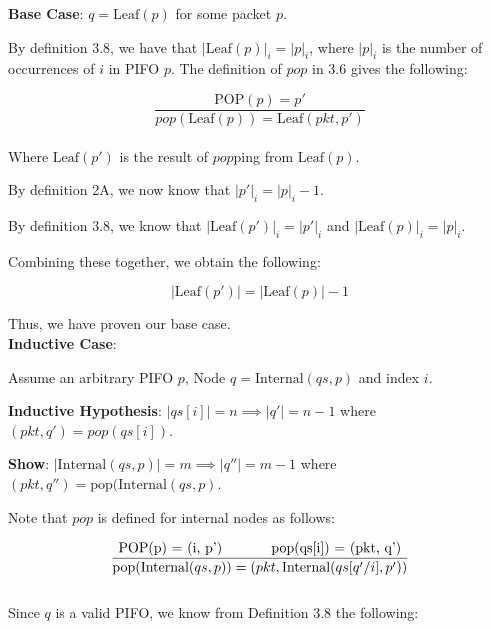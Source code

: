 \documentclass{article}
\begin{document}
\noindent \textbf{Base Case}: $q = \text{Leaf}(p)$ for some packet $p$.\newline

\noindent By definition 3.8, we have that $|\text{Leaf}(p)|_i = |p|_i$, where $|p|_i$ is the number of occurrences of $i$ in PIFO $p$. The definition of $pop$ in 3.6 gives the following:

$$\frac{\text{POP}(p) = p'}{pop(\text{Leaf}(p)) = \text{Leaf}(pkt, p')}$$\\[-10pt]

\noindent Where $\text{Leaf}(p')$ is the result of $pop$ping from $\text{Leaf}(p)$.\newline

\noindent By definition 2A, we now know that $|p'|_i = |p|_i - 1$.\newline

\noindent By definition 3.8, we know that $|\text{Leaf}(p')|_i = |p'|_i$ and $|\text{Leaf}(p)|_i = |p|_i$.\newline

\noindent Combining these together, we obtain the following:

$$|\text{Leaf}(p')| = |\text{Leaf}(p)| - 1$$

\noindent Thus, we have proven our base case.\\[10pt]

\noindent \textbf{Inductive Case}:\newline

\noindent Assume an arbitrary PIFO $p$, Node $q = \text{Internal}(qs, p)$ and index $i$.\newline

\noindent \textbf{Inductive Hypothesis}: $|qs[i]| = n \implies |q'| = n-1$ where $(pkt, q') = pop(qs[i])$.\newline

\noindent \textbf{Show}: $|\text{Internal}(qs, p)| = m \implies |q''| = m-1$ where $(pkt, q'') =\text{pop}(\text{Internal}(qs, p)$.\newline

\noindent Note that $pop$ is defined for internal nodes as follows:

$$\frac{\text{POP(p) = (i, p') \hspace{1cm} \text{pop}(qs[i]) = (pkt, q')}}{{\text{pop}(\text{Internal}(qs, p)) = (pkt, \text{Internal}(qs[q'/i], p'))}}$$\\[-10pt]

\noindent Since $q$ is a valid PIFO, we know from Definition 3.8 the following:
\end{document}
